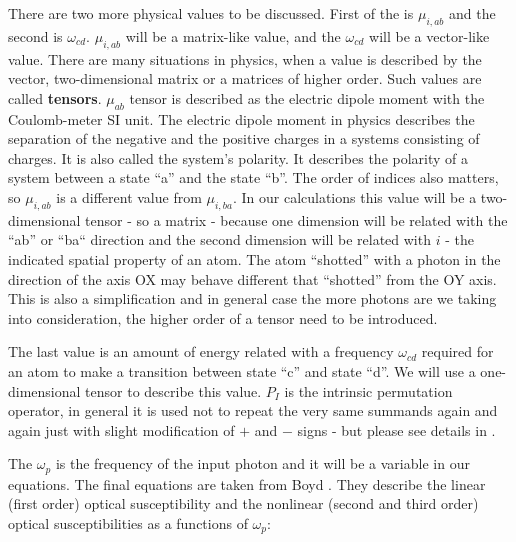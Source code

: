 \documentclass[12pt,twoside,a4paper]{article}
\numberwithin{equation}{subsection}
\numberwithin{figure}{subsection}
\begin{document}
There are two more physical values to be discussed. First of the is $\mu_{i, ab}$ and the second is $\omega_{cd}$. $\mu_{i, ab}$ will be a
matrix-like value, and the $\omega_{cd}$ will be a vector-like value. There are many situations in physics, when a value is
described by the vector, two-dimensional matrix or a matrices of higher order. Such values are called \textbf{tensors}. $\mu_{ab}$ tensor
is described as the electric dipole moment with the Coulomb-meter SI unit. The electric dipole moment in physics describes the separation of
the negative and the positive charges in a systems consisting of charges. It is also called the system's polarity. It describes the polarity
of a system between a state ``a'' and the state ``b''. The order of indices also matters, so $\mu_{i, ab}$ is a different value from
$\mu_{i, ba}$. In our calculations this value will be a two-dimensional tensor - so a matrix - because one dimension will be related with
the ``ab'' or ``ba`` direction and the second dimension will be related with $i$ - the indicated spatial property of an atom. The atom
``shotted'' with a photon in the direction of the axis OX may behave different that ``shotted'' from the OY axis. This is also a
simplification and in general case the more photons are we taking into consideration, the higher order of a tensor need to be introduced.

The last value is an amount of energy related with a frequency $\omega_{cd}$ required for an atom to make a transition between state
``c'' and state ``d''. We will use a one-dimensional tensor to describe this value. $P_{I}$ is the intrinsic permutation operator, in
general it is used not to repeat the very same summands again and again just with slight modification of $+$ and $-$ signs - but please see
details in \cite{boyd_nlo}.

The $\omega_{p}$ is the frequency of the input photon and it will be a variable in our equations. The final equations are taken from Boyd
\cite{boyd_nlo}. They describe the linear (first order) optical susceptibility and the nonlinear (second and third order) optical
susceptibilities as a functions of $\omega_{p}$:
\end{document}
